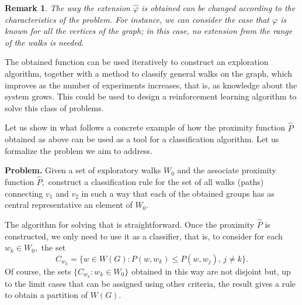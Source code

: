 \documentclass[preprint,12pt]{elsarticle}
\newtheorem{remark}[theorem]{Remark}
\begin{document}
\begin{remark}
The way the extension $\widehat \varphi$ is obtained can be changed according to the characteristics of the problem. For instance, we can consider the case that $\varphi$ is known for all the vertices of the graph; in this case, no extension from the range of the walks is needed. 
\end{remark}


The obtained function can be used iteratively to construct an exploration algorithm,  together with a method to classify general walks on the graph, which improves as the number of experiments increases, that is, as knowledge about the system grows. This could be used to design a reinforcement learning algorithm to solve this class of problems.



Let us show in what follows a concrete example of how the proximity function $\widehat P$ obtained as above can be used as a tool for a classification algorithm. Let us formalize the problem we aim to address.

\vspace{0.4cm}

\textbf{Problem.} Given a set of exploratory walks $W_0$ and the associate proximity function $\widehat P,$ construct a classification rule for the set of all walks (paths) connecting $v_1$ and $v_2$ in such a way that each of the obtained groups has as central representative an element of $W_0.$

The algorithm for solving that is straightforward. Once the proximity $\widehat P$ is constructed, we only need to use it as a classifier, that is, to consider for each $w_k \in W_0,$ the set
$$
C_{w_k}= \Big\{ w \in W(G): P(w,w_k) \le P(w,w_j), \, j \ne k \Big\}.
$$
Of course, the sets $\Big\{ C_{w_k}: w_k \in W_0 \Big\}$ obtained in this way are not disjoint but, up to the limit cases that can be assigned using other criteria, the result gives a rule to obtain a partition of $W(G).$
\end{document}
